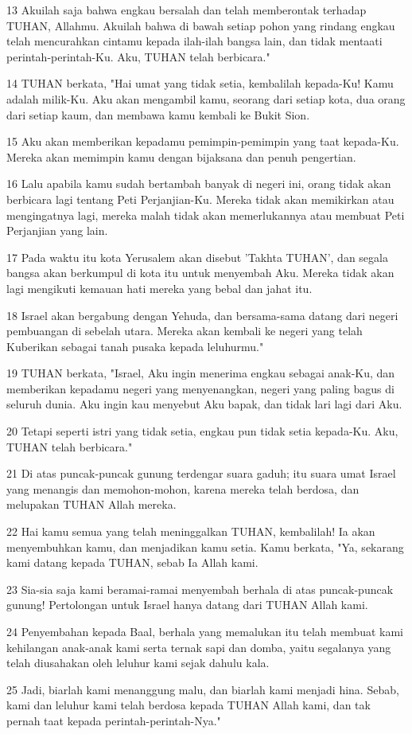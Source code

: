 \par 13 Akuilah saja bahwa engkau bersalah dan telah memberontak terhadap TUHAN, Allahmu. Akuilah bahwa di bawah setiap pohon yang rindang engkau telah mencurahkan cintamu kepada ilah-ilah bangsa lain, dan tidak mentaati perintah-perintah-Ku. Aku, TUHAN telah berbicara."
\par 14 TUHAN berkata, "Hai umat yang tidak setia, kembalilah kepada-Ku! Kamu adalah milik-Ku. Aku akan mengambil kamu, seorang dari setiap kota, dua orang dari setiap kaum, dan membawa kamu kembali ke Bukit Sion.
\par 15 Aku akan memberikan kepadamu pemimpin-pemimpin yang taat kepada-Ku. Mereka akan memimpin kamu dengan bijaksana dan penuh pengertian.
\par 16 Lalu apabila kamu sudah bertambah banyak di negeri ini, orang tidak akan berbicara lagi tentang Peti Perjanjian-Ku. Mereka tidak akan memikirkan atau mengingatnya lagi, mereka malah tidak akan memerlukannya atau membuat Peti Perjanjian yang lain.
\par 17 Pada waktu itu kota Yerusalem akan disebut 'Takhta TUHAN', dan segala bangsa akan berkumpul di kota itu untuk menyembah Aku. Mereka tidak akan lagi mengikuti kemauan hati mereka yang bebal dan jahat itu.
\par 18 Israel akan bergabung dengan Yehuda, dan bersama-sama datang dari negeri pembuangan di sebelah utara. Mereka akan kembali ke negeri yang telah Kuberikan sebagai tanah pusaka kepada leluhurmu."
\par 19 TUHAN berkata, "Israel, Aku ingin menerima engkau sebagai anak-Ku, dan memberikan kepadamu negeri yang menyenangkan, negeri yang paling bagus di seluruh dunia. Aku ingin kau menyebut Aku bapak, dan tidak lari lagi dari Aku.
\par 20 Tetapi seperti istri yang tidak setia, engkau pun tidak setia kepada-Ku. Aku, TUHAN telah berbicara."
\par 21 Di atas puncak-puncak gunung terdengar suara gaduh; itu suara umat Israel yang menangis dan memohon-mohon, karena mereka telah berdosa, dan melupakan TUHAN Allah mereka.
\par 22 Hai kamu semua yang telah meninggalkan TUHAN, kembalilah! Ia akan menyembuhkan kamu, dan menjadikan kamu setia. Kamu berkata, "Ya, sekarang kami datang kepada TUHAN, sebab Ia Allah kami.
\par 23 Sia-sia saja kami beramai-ramai menyembah berhala di atas puncak-puncak gunung! Pertolongan untuk Israel hanya datang dari TUHAN Allah kami.
\par 24 Penyembahan kepada Baal, berhala yang memalukan itu telah membuat kami kehilangan anak-anak kami serta ternak sapi dan domba, yaitu segalanya yang telah diusahakan oleh leluhur kami sejak dahulu kala.
\par 25 Jadi, biarlah kami menanggung malu, dan biarlah kami menjadi hina. Sebab, kami dan leluhur kami telah berdosa kepada TUHAN Allah kami, dan tak pernah taat kepada perintah-perintah-Nya."

